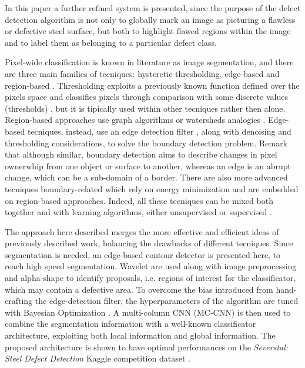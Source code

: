     \par{
        In this paper a further refined system is presented, since the purpose of the defect detection algorithm is not only to globally mark an image as picturing a flawless or defective steel surface, but both to highlight flawed regions within the image and to label them as belonging to a particular defect class.
    }
    \par{
        Pixel-wide classification is known in literature as image segmentation, and there are three main families of tecniques: hysteretic thresholding, edge-based and region-based \cite{ieee:7684170}. Thresholding exploits a previously known function defined over the pixels space and classifies pixels through comparison with some discrete values (thresholds) \cite{ieee:4310039}, but it is tipically used within other tecniques rather then alone. Region-based approaches use graph algorithms \cite{ieee:6205760, ieee:868688} or watersheds analogies \cite{ieee:87344}. Edge-based tecniques, instead, use an edge detection filter \cite{Klette:2014:CCV:2584519, googlescholar:kovesiphase, researchgate:phase}, along with denoising and thresholding considerations, to solve the boundary detection problem. Remark that although similar, boundary detection aims to describe changes in pixel ownerwhip from one object or surface to another, whereas an edge is an abrupt change, which can be a sub-domain of a border. There are also more advanced tecniques \cite{springer:Kass1988} boundary-related which rely on energy minimization and are embedded on region-based approaches. Indeed, all these tecniques can be mixed both together and with learning algorithms, either unsupervised \cite{ieee:7684170} or supervised \cite{ieee:1273918}.
    }
    \par{
        The approach here described merges the more effective and efficient ideas of previously described work, balancing the drawbacks of different tecniques. Since segmentation is needed, an edge-based contour detector is presented here, to reach high speed segmentation. Wavelet are used along with image preprocessing and alpha-shape \cite{springer:10.1007/11907350_46} to identify proposals, i.e. regions of interest for the classificator, which may contain a defective area. To overcome the bias introduced from hand-crafting the edge-detection filter, the hyperparameters of the algorithm are tuned with Bayesian Optimization \cite{arXiv:2018arXiv180702811F, arXiv:2012arXiv1206.2944S, rasmussen:williams:2006}.
        A multi-column CNN (MC-CNN) \cite{ieee:6248110} is then used to combine the segmentation information with a well-known classificator architecture, exploiting both local information and global information. The proposed architecture is shown to have optimal performances on the \emph{Severstal: Steel Defect Detection} Kaggle competition dataset \cite{kaggle:severstal}.
    }